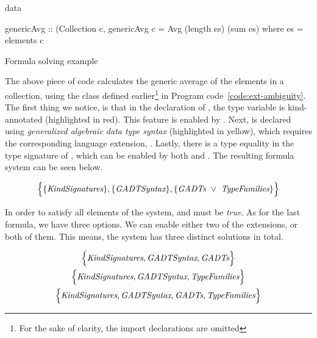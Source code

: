 \documentclass[main.tex]{subfiles}
\begin{document}
	\begin{codeFloat}[H]
		\begin{haskell}
			data %
			
			genericAvg :: (Collection c,  %
			genericAvg c = Avg (length es) (sum es)
			  where es = elements c
		\end{haskell}
		\caption{Formula solving example}
		\label{code:sat-solving}
	\end{codeFloat}
	
	The above piece of code calculates the generic average of the elements in a collection, using the  class defined earlier\footnote{For the sake of clarity, the import declarations are omitted} in Program code~\ref{code:ext-ambiguity}. The first thing we notice, is that in the declaration of , the type variable  is kind-annotated (highlighted in red). This feature is enabled by . Next,  is declared using \emph{generalized algebraic data type syntax} (highlighted in yellow), which requires the corresponding language extension, . Lastly, there is a type equality in the type signature of , which can be enabled by both  and . The resulting formula system can be seen below.
	
	\begin{align*}
		\Big\{ \{\textit{KindSignatures}\}, \{\textit{GADTSyntax}\}, \{\textit{GADTs}~\lor~\textit{TypeFamilies}\} \Big\}
	\end{align*}
	
	In order to satisfy all elements of the system,  and  must be \emph{true}. As for the last formula, we have three options. We can enable either two of the extensions, or both of them. This means, the system has three distinct solutions in total.
	
	\begin{gather}
		\Big\{ \textit{KindSignatures}, \textit{GADTSyntax}, \textit{GADTs} \Big\} \label{eq:set-GADTs} \\
		\Big\{ \textit{KindSignatures}, \textit{GADTSyntax}, \textit{TypeFamilies} \Big\} \label{eq:set-TypeFamilies} \\
		\Big\{ \textit{KindSignatures}, \textit{GADTSyntax}, \textit{GADTs}, \textit{TypeFamilies} \Big\} \label{eq:set-both}
	\end{gather}
	
\end{document}
